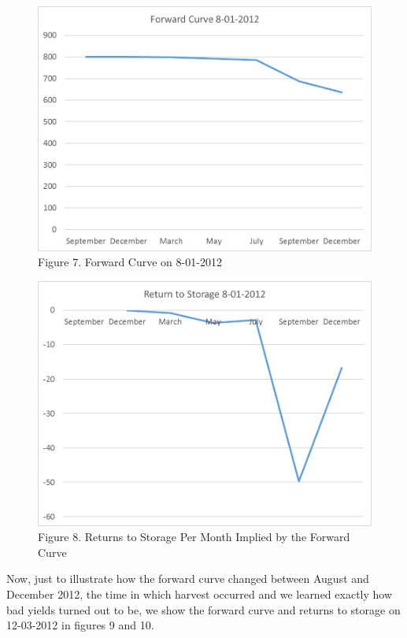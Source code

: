 \documentclass[]{book}
\theoremstyle{definition}
\theoremstyle{definition}
\theoremstyle{remark}
\begin{document}
\begin{figure}[htbp]
\centering
\includegraphics{Excel-files/PricesSpaceTime/forward-curves_files/image013.png}
\caption{Figure 7. Forward Curve on 8-01-2012}
\end{figure}

\begin{figure}[htbp]
\centering
\includegraphics{Excel-files/PricesSpaceTime/forward-curves_files/image015.png}
\caption{Figure 8. Returns to Storage Per Month Implied by the Forward
Curve}
\end{figure}

Now, just to illustrate how the forward curve changed between August and
December 2012, the time in which harvest occurred and we learned exactly
how bad yields turned out to be, we show the forward curve and returns
to storage on 12-03-2012 in figures 9 and 10.
\end{document}
